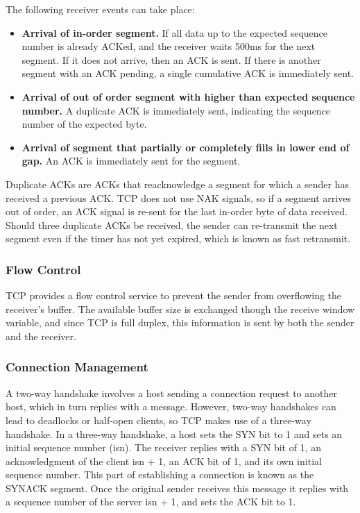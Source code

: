 \documentclass[12pt,titlepage]{article}
\begin{document}
        The following receiver events can take place:
        \begin{itemize}
          \item \textbf{Arrival of in-order segment.} If all data up to the expected sequence number is already ACKed, and the receiver waits 500ms for the next segment. If it does not
            arrive, then an ACK is sent. If there is another segment with an ACK pending, a single cumulative ACK is immediately sent.
          \item \textbf{Arrival of out of order segment with higher than expected sequence number.} A duplicate ACK is immediately sent, indicating the sequence number of the expected byte.
          \item \textbf{Arrival of segment that partially or completely fills in lower end of gap.} An ACK is immediately sent for the segment.
        \end{itemize}

        Duplicate ACKs are ACKs that reacknowledge a segment for which a sender has received a previous ACK. TCP does not use NAK signals, so if a segment arrives out of order, an ACK signal
        is re-sent for the last in-order byte of data received. Should three duplicate ACKs be received, the sender can re-transmit the next segment even if the timer has not yet expired,
        which is known as fast retransmit.

      \subsubsection{Flow Control}
        TCP provides a flow control service to prevent the sender from overflowing the receiver's buffer. The available buffer size is exchanged though the receive window variable, and since
        TCP is full duplex, this information is sent by both the sender and the receiver.

      \subsubsection{Connection Management}
        A two-way handshake involves a host sending a connection request to another host, which in turn replies with a message. However, two-way handshakes can lead to deadlocks or half-open
        clients, so TCP makes use of a three-way handshake. In a three-way handshake, a host sets the SYN bit to 1 and sets an initial sequence number (isn). The receiver replies with a
        SYN bit of 1, an acknowledgment of the client isn + 1, an ACK bit of 1, and its own initial sequence number. This part of establishing a connection is known as the SYNACK segment.
        Once the original sender receives this message it replies with a sequence number of the server isn + 1, and sets the ACK bit to 1.
\end{document}

